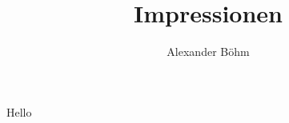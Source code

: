 \documentclass[11pt]{book}
\title{Impressionen}
\author{Alexander Böhm}
\begin{document}
\maketitle
Hello
\end{document}
